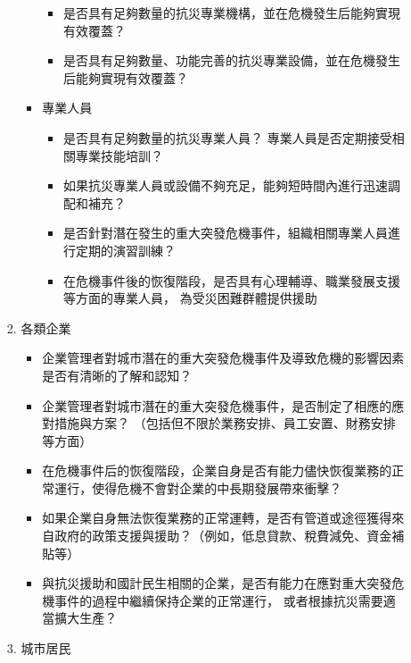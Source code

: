 \documentclass[a4paper,12pt]{article}
\begin{document}
\begin{enumerate}
\begin{enumerate}
\begin{enumerate}
\begin{itemize}
\begin{itemize}
\item 是否具有足夠數量的抗災專業機構，並在危機發生后能夠實現有效覆蓋？\\
\item 是否具有足夠數量、功能完善的抗災專業設備，並在危機發生后能夠實現有效覆蓋？\\
\end{itemize}
\item 專業人員
\label{sec:org2f646ec}
\begin{itemize}
\item 是否具有足夠數量的抗災專業人員？ 專業人員是否定期接受相關專業技能培訓？\\
\item 如果抗災專業人員或設備不夠充足，能夠短時間內進行迅速調配和補充？\\
\item 是否針對潛在發生的重大突發危機事件，組織相關專業人員進行定期的演習訓練？\\
\item 在危機事件後的恢復階段，是否具有心理輔導、職業發展支援等方面的專業人員， 為受災困難群體提供援助\\
\end{itemize}
\end{itemize}
\item 各類企業
\label{sec:org42eef53}
\begin{itemize}
\item 企業管理者對城市潛在的重大突發危機事件及導致危機的影響因素是否有清晰的了解和認知？\\
\item 企業管理者對城市潛在的重大突發危機事件，是否制定了相應的應對措施與方案？ （包括但不限於業務安排、員工安置、財務安排等方面）\\
\item 在危機事件后的恢復階段，企業自身是否有能力儘快恢復業務的正常運行，使得危機不會對企業的中長期發展帶來衝擊？\\
\item 如果企業自身無法恢復業務的正常運轉，是否有管道或途徑獲得來自政府的政策支援與援助？（例如，低息貸款、稅費減免、資金補貼等）\\
\item 與抗災援助和國計民生相關的企業，是否有能力在應對重大突發危機事件的過程中繼續保持企業的正常運行， 或者根據抗災需要適當擴大生產？\\
\end{itemize}
\item 城市居民
\label{sec:org008c034}
\begin{itemize}

\end{itemize}
\end{enumerate}
\end{enumerate}
\end{enumerate}
\end{document}
